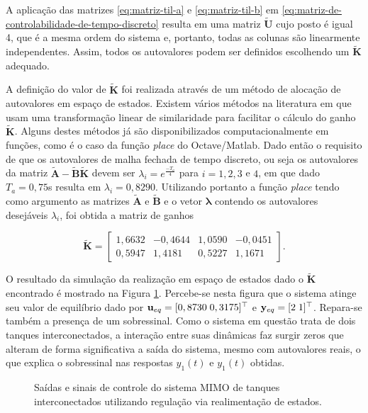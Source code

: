 A aplicação das matrizes \ref{eq:matriz-til-a} e \ref{eq:matriz-til-b} em
\ref{eq:matriz-de-controlabilidade-de-tempo-discreto} resulta em uma matriz
$\mathbf{\tilde{U}}$ cujo posto é igual 4, que é a mesma ordem do sistema e,
portanto, todas as colunas são linearmente independentes. Assim, todos os
autovalores podem ser definidos escolhendo um $\mathbf{\tilde{K}}$ adequado.

A definição do valor de $\mathbf{\tilde{K}}$ foi realizada através de um método
de alocação de autovalores em espaço de estados. Existem vários métodos na
literatura em que usam uma transformação linear de similaridade para facilitar o
cálculo do ganho $\mathbf{\tilde{K}}$. Alguns destes métodos já são
disponibilizados computacionalmente em funções, como é o caso da função
\textit{place} do Octave/Matlab. Dado então o requisito de que os autovalores de
malha fechada de tempo discreto, ou seja os autovalores da matriz
$\mathbf{\tilde{A} - \tilde{B}\tilde{K}}$ devem ser $\lambda_i =
e^{\frac{-T_a}{4}}$ para $i = 1, 2, 3$ e $4$, em que dado $T_a = 0,75$s resulta em
$\lambda_i = 0,8290$. Utilizando portanto a função \textit{place} tendo como
argumento as matrizes $\mathbf{\tilde{A}}$ e $\mathbf{\tilde{B}}$ e o vetor
$\mathbf{\lambda}$ contendo os autovalores desejáveis $\lambda_i$, foi obtida a
matriz de ganhos

\begin{equation}
    \label{eq:matriz-de-ganhos-discreto}
    \mathbf{\tilde{K}} = 
    \begin{bmatrix}
        1,6632 & -0,4644 & 1,0590 & -0,0451    \\
        0,5947 & 1,4181 &  0,5227 & 1,1671
    \end{bmatrix}.
\end{equation}

O resultado da simulação da realização em espaço de estados dado o
$\mathbf{\tilde{K}}$ encontrado é mostrado na Figura
\ref{fig:resultado-do-regulador-via-realimentacao-de-estados}. Percebe-se nesta
figura que o sistema atinge seu valor de equilíbrio dado por $\mathbf{u}_{eq} =
[0,8730 \thickspace 0,3175]^\top$ e $\mathbf{y}_{eq} = [2 \thickspace 1]^\top$.
Repara-se também a presença de um sobressinal. Como o sistema em questão trata
de dois tanques interconectados, a interação entre suas dinâmicas faz surgir
zeros que alteram de forma significativa a saída do sistema, mesmo com
autovalores reais, o que explica o sobressinal nas respostas $y_1(t)$ e $y_1(t)$
obtidas.

\begin{figure}[!htp]
    \caption{Saídas e sinais de controle do sistema MIMO de tanques
    interconectados utilizando regulação via realimentação de estados.}
    \vspace{-10pt}
    \hspace{-30pt}
    \label{fig:resultado-do-regulador-via-realimentacao-de-estados}
    \begin{minipage}{\linewidth}
        
    \end{minipage}
    \vspace{-10pt}
\end{figure}


